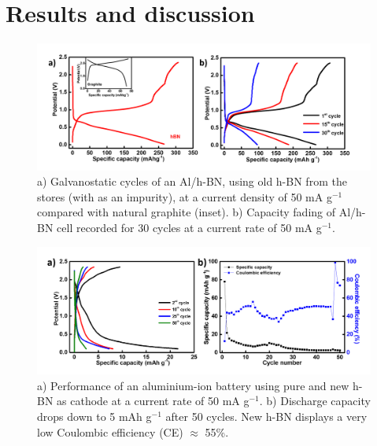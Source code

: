 \section{Results and discussion}

\begin{figure}[tbh!]
\centering
\includegraphics[width=\textwidth]{Figures/BOhBN/hBNiniCDC}
\caption{a) Galvanostatic cycles of an Al/h-BN, using old h-BN from the stores (with  as an impurity), at a current density of 50 mA g$^{-1}$ compared with natural graphite (inset). b) Capacity fading of Al/h-BN cell recorded for 30 cycles at a current rate of 50 mA g$^{-1}$.}
\label{Figures/BOhBN:hBNiniCDC}
\end{figure}

\begin{figure}[tbh!]
\centering
\includegraphics[width=\textwidth]{Figures/BOhBN/BNNSCDCCE}
\caption{a) Performance of an aluminium-ion battery using pure and new h-BN as cathode at a current rate of 50 mA g$^{-1}$. b) Discharge capacity drops down to 5 mAh g$^{-1}$ after 50 cycles. New h-BN displays a very low Coulombic efficiency (CE) $\approx$ 55\%.}
\label{Figures/BOhBN:hBNCDCCE}
\end{figure}

